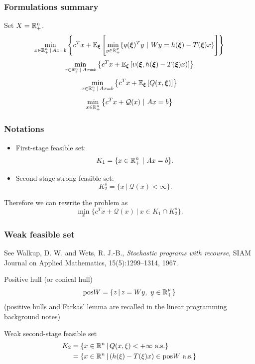 \documentclass[aspectratio=169]{beamer}
\begin{document}
\begin{frame}
\frametitle{Formulations summary}

Set $X = {\mathbb{R}}^n_+$.
\[
\min_{x \in \RR^n_+ \,|\, Ax = b} \left\lbrace c^Tx + \EE_{\bsxi} \left[ \min_{y \in \RR^p_+} \lbrace q(\bsxi)^Ty \ |\ Wy = h(\bsxi) - T(\bsxi)x \rbrace \right] \right\rbrace 
\]
\[
\min_{x \in {\mathbb{R}}^n_+ \,|\, Ax = b} \left\lbrace c^Tx + {\mathbb{E}}_{{\boldsymbol{\xi}}}
  \left[  v({\boldsymbol{\xi}}, h({\boldsymbol{\xi}})-T({\boldsymbol{\xi}})x) \right] \right\rbrace 
\]
\[
\min_{x \in {\mathbb{R}}^n_+ \,|\, Ax = b} \left\lbrace c^Tx + {\mathbb{E}}_{{\boldsymbol{\xi}}} \left[ Q(x,{\boldsymbol{\xi}}) \right] \right\rbrace 
\]
\[
\min_{x \in {\mathbb{R}}^n_+} \left\lbrace c^Tx + \mathcal{Q}(x)
  \ |\ Ax = b \right\rbrace 
\]

\end{frame}

\begin{frame}
\frametitle{Notations}

\begin{itemize}
\item
{\red First-stage feasible set}:
\[
K_1 = \lbrace x \in {\mathbb{R}}^n_+ \ |\ Ax = b \rbrace.
\]
\item
{\red Second-stage strong feasible set}:
\[
K_2^s = \lbrace x \ |\ \mathcal{Q}(x) < \infty \rbrace.
\]
\end{itemize}

\mbox{}

Therefore we can rewrite the problem as
\[
\min_x \lbrace c^Tx + \mathcal{Q}(x) \ |\ x \in K_1 \cap K_2^s \rbrace.
\]

\end{frame}

\begin{frame}
\frametitle{Weak feasible set}

See Walkup, D. W. and Wets, R. J.-B., {\it Stochastic programs with recourse}, SIAM Journal on Applied Mathematics, 15(5):1299--1314, 1967.

\mbox{}

{\red Positive hull} (or conical hull)
$$
\text{pos}W = \lbrace z \,|\, z = Wy,\ y \in {\mathbb{R}}^p_+ \rbrace
$$
(positive hulls and Farkas' lemma are recalled in the linear programming background notes)

\mbox{}

{\red Weak second-stage feasible set}
\begin{align*}
K_2 &= \lbrace x \in {\mathbb{R}}^n \,|\, Q(x,\xi) < +\infty \text{ a.s.} \rbrace \\
&= \lbrace x \in {\mathbb{R}}^n \,|\, (h(\xi) - T(\xi)x) \in \text{pos} W \text{ a.s.} \rbrace
\end{align*}

\end{frame}
\end{document}
